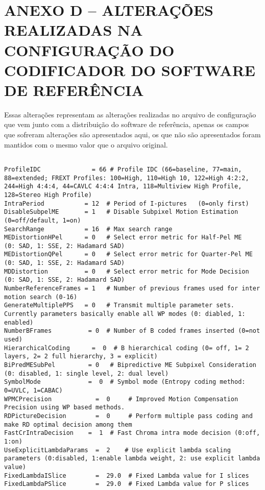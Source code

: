 \chapter{ANEXO D -- ALTERAÇÕES REALIZADAS NA CONFIGURAÇÃO DO CODIFICADOR DO SOFTWARE DE REFERÊNCIA}

Essas alterações representam as alterações realizadas no arquivo de configuração que vem junto com a distribuição do software de referência, apenas os campos que sofreram alterações são apresentados aqui, os que não são apresentados foram mantidos com o mesmo valor que o arquivo original.

\begin{lstlisting}

ProfileIDC              = 66 # Profile IDC (66=baseline, 77=main, 88=extended; FREXT Profiles: 100=High, 110=High 10, 122=High 4:2:2, 244=High 4:4:4, 44=CAVLC 4:4:4 Intra, 118=Multiview High Profile, 128=Stereo High Profile)
IntraPeriod           = 12  # Period of I-pictures   (0=only first)
DisableSubpelME       = 1   # Disable Subpixel Motion Estimation (0=off/default, 1=on)
SearchRange           = 16  # Max search range
MEDistortionHPel      = 0   # Select error metric for Half-Pel ME    (0: SAD, 1: SSE, 2: Hadamard SAD)
MEDistortionQPel      = 0   # Select error metric for Quarter-Pel ME (0: SAD, 1: SSE, 2: Hadamard SAD)
MDDistortion          = 0   # Select error metric for Mode Decision  (0: SAD, 1: SSE, 2: Hadamard SAD)
NumberReferenceFrames = 1   # Number of previous frames used for inter motion search (0-16)
GenerateMultiplePPS   = 0   # Transmit multiple parameter sets. Currently parameters basically enable all WP modes (0: diabled, 1: enabled)
NumberBFrames          = 0  # Number of B coded frames inserted (0=not used)
HierarchicalCoding      =  0  # B hierarchical coding (0= off, 1= 2 layers, 2= 2 full hierarchy, 3 = explicit)
BiPredMESubPel         = 0   # Bipredictive ME Subpixel Consideration (0: disabled, 1: single level, 2: dual level)
SymbolMode             =  0  # Symbol mode (Entropy coding method: 0=UVLC, 1=CABAC)
WPMCPrecision            =  0     # Improved Motion Compensation Precision using WP based methods.
RDPictureDecision        =  0     # Perform multiple pass coding and make RD optimal decision among them
FastCrIntraDecision    =  1  # Fast Chroma intra mode decision (0:off, 1:on)
UseExplicitLambdaParams  =  2    # Use explicit lambda scaling parameters (0:disabled, 1:enable lambda weight, 2: use explicit lambda value)
FixedLambdaISlice        =  29.0  # Fixed Lambda value for I slices
FixedLambdaPSlice        =  29.0  # Fixed Lambda value for P slices

\end{lstlisting}
